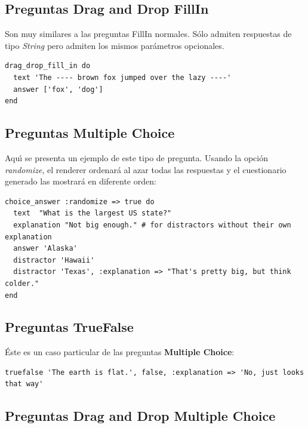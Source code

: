 \subsection{Preguntas Drag and Drop FillIn}
\label{subsec:Apendice2.2}

Son muy similares a las preguntas FillIn normales. S\'olo admiten respuestas de tipo \textit{String} pero admiten los mismos par\'ametros opcionales.
\begin{verbatim}
drag_drop_fill_in do
  text 'The ---- brown fox jumped over the lazy ----'
  answer ['fox', 'dog']
end
\end{verbatim}

\subsection{Preguntas Multiple Choice}
\label{subsec:Apendice2.3}

Aqu\'{\i} se presenta un ejemplo de este tipo de pregunta. Usando la opci\'on \textit{randomize}, el renderer ordenar\'a al azar todas las respuestas
y el cuestionario generado las mostrar\'a en diferente orden:
\begin{verbatim}
choice_answer :randomize => true do
  text  "What is the largest US state?"
  explanation "Not big enough." # for distractors without their own explanation
  answer 'Alaska'
  distractor 'Hawaii'
  distractor 'Texas', :explanation => "That's pretty big, but think colder."
end
\end{verbatim}

\subsection{Preguntas TrueFalse}
\label{subsec:Apendice2.4}

\'Este es un caso particular de las preguntas {\bfseries Multiple Choice}:
\begin{verbatim}
truefalse 'The earth is flat.', false, :explanation => 'No, just looks that way'
\end{verbatim}

\subsection{Preguntas Drag and Drop Multiple Choice}
\label{subsec:Apendice2.5}

